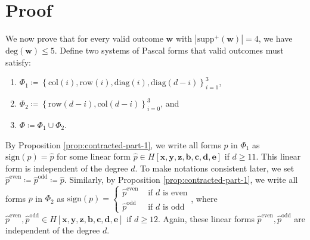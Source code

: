\section{Proof}

We now prove that for every valid outcome \( \mathbf{w} \) with \( |\mathrm{supp}^+(\mathbf{w})| = 4 \), we have \( \mathrm{deg}(\mathbf{w}) \leq 5 \). Define two systems of Pascal forms that valid outcomes must satisfy: 
\begin{enumerate}
    \item \( \Phi_1 \coloneqq \left\{ \mathrm{col}(i), \mathrm{row}(i), \mathrm{diag}(i), \mathrm{diag}(d-i) \right\}_{i=1}^3 \), 
    \item \( \Phi_2 \coloneqq \left\{ \mathrm{row}(d-i), \mathrm{col}(d-i) \right\}_{i=0}^3 \), and 
    \item \( \Phi \coloneqq \Phi_1 \cup \Phi_2 \).
\end{enumerate}



By Proposition \ref{prop:contracted-part-1}, we write all forms \( p \) in \( \Phi_1 \) as \( \mathrm{sign}(p) = \hat p \)
for some linear form \( \hat p \in H[\mathbf{x}, \mathbf{y}, \mathbf{z}, \mathbf{b}, \mathbf{c}, \mathbf{d}, \mathbf{e}] \) if \( d \geq 11 \). This linear form is independent of the degree \( d \). To make notations consistent later, we set \( \hat p^{\mathrm{even}} \coloneqq  \hat p^{\mathrm{odd}}  \coloneqq \hat p\). Similarly, by Proposition \ref{prop:contracted-part-1}, we write all forms \( p \) in \( \Phi_2 \) as \( \mathrm{sign}(p) = \begin{cases}
    \hat p^{\mathrm{even}} & \text{ if } d \text{ is even} \\
    \hat p^{\mathrm{odd}} & \text{ if } d \text{ is odd}
\end{cases} \), where \( \hat p^{\mathrm{even}}, \hat p^{\mathrm{odd}} \in H[\mathbf{x}, \mathbf{y}, \mathbf{z}, \mathbf{b}, \mathbf{c}, \mathbf{d}, \mathbf{e}] \) if \( d \geq 12 \). Again, these linear forms \( \hat p^{\mathrm{even}}, \hat p^{\mathrm{odd}}  \) are independent of the degree \( d \).

